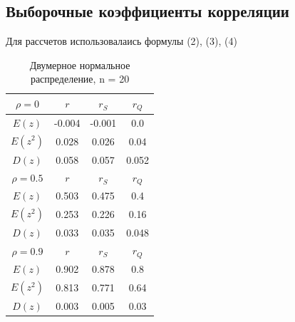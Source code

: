 \documentclass[a4paper]{article}
\begin{document}
\subsection{Выборочные коэффициенты корреляции}
Для рассчетов использовалаись формулы (2), (3), (4)
	\begin{table}[H]
		\centering
		\begin{tabular}{| c | c | c | c |}
			
			\hline
                 $\rho = 0$ & $r$      & $r_S$  & $r_Q$ \\
                 \hline
                 $E(z)$    & -0.004 & -0.001 & 0.0   \\
                 $E(z^{2}) $  & 0.028  & 0.026  & 0.04  \\
                 $D(z)$    & 0.058  & 0.057  & 0.052 \\
                \hline
			$\rho = 0.5$ & $r$      & $r_S$  & $r_Q$ \\
                \hline
                $E(z)$      & 0.503 & 0.475 & 0.4   \\
                $E(z^{2}) $   & 0.253 & 0.226 & 0.16  \\
                $D(z)$      & 0.033 & 0.035 & 0.048 \\
                \hline
			$\rho = 0.9$ & $r$      & $r_S$  & $r_Q$ \\
                \hline
                 $E(z)$      & 0.902 & 0.878 & 0.8   \\
                 $E(z^{2}) $    & 0.813 & 0.771 & 0.64  \\
                 $D(z)$      & 0.003 & 0.005 & 0.03  \\
			\hline
			
		\end{tabular}{}
		\caption{Двумерное нормальное распределение, n = 20}
		\label{tab:n20}
	\end{table}
	
\end{document}
